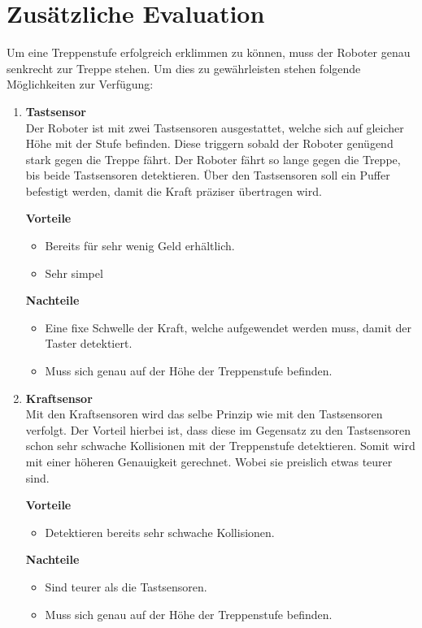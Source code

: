 \section*{Zusätzliche Evaluation}\label{ausrichtung-zur-treppe-evaluation}
Um eine Treppenstufe erfolgreich erklimmen zu können, muss der Roboter genau senkrecht zur Treppe stehen. Um dies zu gewährleisten stehen folgende Möglichkeiten zur Verfügung:
\begin{enumerate}
    \item \textbf{Tastsensor}\\
    Der Roboter ist mit zwei Tastsensoren ausgestattet, welche sich auf gleicher Höhe mit der Stufe befinden. Diese triggern sobald der Roboter genügend stark gegen die Treppe fährt. Der Roboter fährt so lange gegen die Treppe, bis beide Tastsensoren detektieren. Über den Tastsensoren soll ein Puffer befestigt werden, damit die Kraft präziser übertragen wird.
    
    \textbf{Vorteile}
    \begin{itemize}
        \item Bereits für sehr wenig Geld erhältlich.
        \item Sehr simpel
    \end{itemize}
    \textbf{Nachteile}
    \begin{itemize}
        \item Eine fixe Schwelle der Kraft, welche aufgewendet werden muss, damit der Taster detektiert.
        \item Muss sich genau auf der Höhe der Treppenstufe befinden.
    \end{itemize}
    
    \item \textbf{Kraftsensor}\\
    Mit den Kraftsensoren wird das selbe Prinzip wie mit den Tastsensoren verfolgt. Der Vorteil hierbei ist, dass diese im Gegensatz zu den Tastsensoren schon sehr schwache Kollisionen mit der Treppenstufe detektieren. Somit wird mit einer höheren Genauigkeit gerechnet. Wobei sie preislich etwas teurer sind.
    
    \textbf{Vorteile}
    \begin{itemize}
        \item Detektieren bereits sehr schwache Kollisionen.
    \end{itemize}
    \textbf{Nachteile}
    \begin{itemize}
        \item Sind teurer als die Tastsensoren.
        \item Muss sich genau auf der Höhe der Treppenstufe befinden.
    \end{itemize}
    

\end{enumerate}
